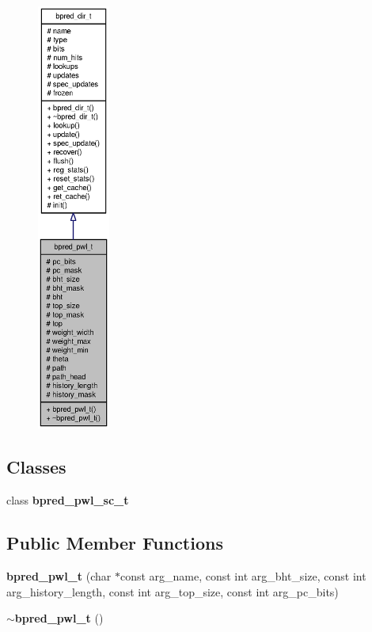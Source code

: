 \begin{figure}[H]
\begin{center}
\leavevmode
\includegraphics[height=400pt]{classbpred__pwl__t__coll__graph}
\end{center}
\end{figure}
\subsection*{Classes}
\begin{CompactItemize}
\item 
class {\bf bpred\_\-pwl\_\-sc\_\-t}
\end{CompactItemize}
\subsection*{Public Member Functions}
\begin{CompactItemize}
\item 
{\bf bpred\_\-pwl\_\-t} (char $\ast$const arg\_\-name, const int arg\_\-bht\_\-size, const int arg\_\-history\_\-length, const int arg\_\-top\_\-size, const int arg\_\-pc\_\-bits)
\item 
{\bf $\sim$bpred\_\-pwl\_\-t} ()
\end{CompactItemize}
